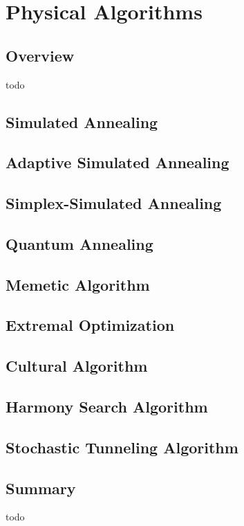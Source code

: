 \chapter{Physical Algorithms}
\label{ch:physical}

\section{Overview}
todo




\section{Simulated Annealing}
\section{Adaptive Simulated Annealing}
\section{Simplex-Simulated Annealing}
\section{Quantum Annealing}
\section{Memetic Algorithm}
\section{Extremal Optimization}
\section{Cultural Algorithm}
\section{Harmony Search Algorithm}
\section{Stochastic Tunneling Algorithm}


\section{Summary}
todo
